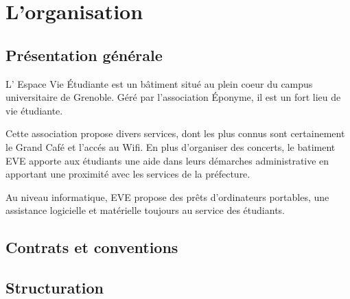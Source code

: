 \section{L'organisation}

\subsection{Présentation générale}
\label{presentation}

L' Espace Vie Étudiante est un bâtiment situé au plein coeur du campus 
universitaire de Grenoble. Géré par l'association  Éponyme, il est un fort 
lieu de vie étudiante.

Cette association propose divers services, dont les plus connus sont certainement
le  Grand Café et l'accés au  Wifi. En plus d'organiser des concerts, le 
batiment EVE apporte aux étudiants une aide dans leurs démarches administrative 
en apportant une proximité avec les services de la préfecture.

Au niveau informatique, EVE propose des prêts d'ordinateurs portables, une assistance
logicielle et matérielle toujours au service des étudiants.

\subsection{Contrats et conventions}
\label{contrats}

\subsection{Structuration}

\label{structuration}
